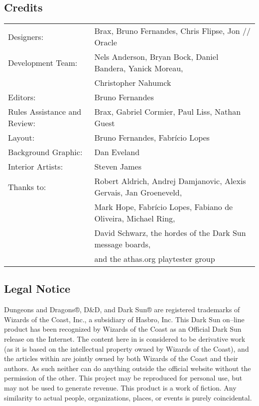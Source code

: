 \documentclass{report}
\begin{document}
\chapter*{}
\section*{Credits}
\begin{tabular}{l l}
  Designers: & Brax, Bruno Fernandes, Chris Flipse, Jon // Oracle \\
  Development Team: & Nels Anderson, Bryan Bock, Daniel Bandera, Yanick Moreau, \\
    & Christopher Nahumck \\
  Editors: & Bruno Fernandes \\
  Rules Assistance and Review: & Brax, Gabriel Cormier, Paul Liss, Nathan Guest \\
  Layout: & Bruno Fernandes, Fabrício Lopes \\
  Background Graphic: & Dan Eveland \\
  Interior Artists: & Steven James \\
  Thanks to: & Robert Aldrich, Andrej Damjanovic, Alexis Gervais, Jan Groeneveld, \\
    & Mark Hope, Fabrício Lopes, Fabiano de Oliveira, Michael Ring, \\
    & David Schwarz, the hordes of the Dark Sun message boards, \\
    & and the athas.org playtester group \\
\end{tabular}

\section*{Legal Notice}
Dungeons and Dragons®, D\&D, and Dark Sun® are registered trademarks of Wizards of the Coast, Inc., a subsidiary of Hasbro, Inc. This Dark Sun on–line product has been recognized by Wizards of the Coast as an Official Dark Sun release on the Internet. The content here in is considered to be derivative work (as it is based on the intellectual property owned by Wizards of the Coast), and the articles within are jointly owned by both Wizards of the Coast and their authors. As such neither can do anything outside the official website without the permission of the other. This project may be reproduced for personal use, but may not be used to generate revenue. This product is a work of fiction. Any similarity to actual people, organizations, places, or events is purely coincidental.
\end{document}
